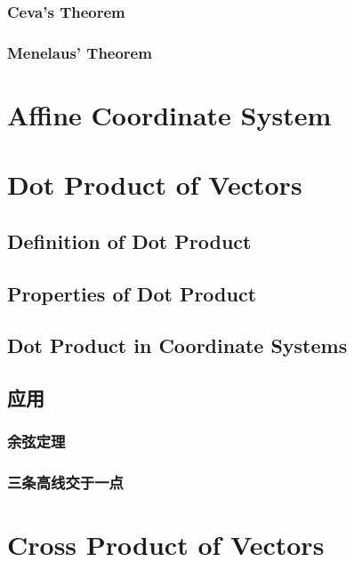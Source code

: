 \documentclass[onecolumn]{ctexart}
\begin{document}
\subsubsection{Ceva's Theorem}

\subsubsection{Menelaus' Theorem}

\section{Affine Coordinate System}



\section{Dot Product of Vectors}

\subsection{Definition of Dot Product}

\subsection{Properties of Dot Product}

\subsection{Dot Product in Coordinate Systems}

\subsection{应用}

\subsubsection{余弦定理}

\subsubsection{三条高线交于一点}

\section{Cross Product of Vectors}
\end{document}

